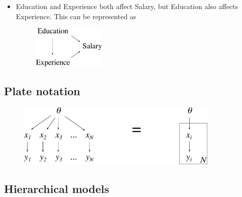 \begin{itemize}
	\item Education and Experience both affect Salary, but Education also affects Experience. This can be represented as
	\begin{figure}[h!]
	\centering
		\includegraphics[height=20mm]{./figs/04-education-salary.pdf} 
	\end{figure}
\end{itemize}

\subsection{Plate notation}

\begin{figure}[h!]
\centering
	\includegraphics[height=30mm]{./figs/04-plate-notation.pdf}
\end{figure}

\newpage
\subsection{Hierarchical models}

